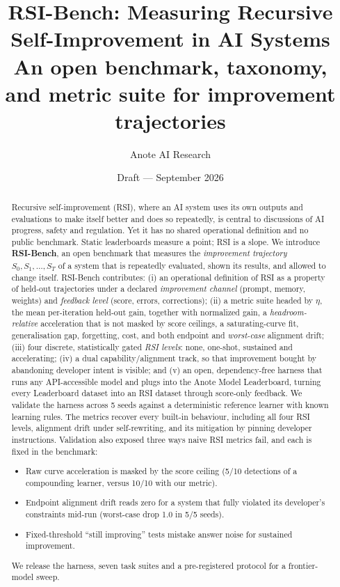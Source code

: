 \documentclass[11pt]{article}
\title{RSI-Bench: Measuring Recursive Self-Improvement in AI Systems\\[0.3em]
\large An open benchmark, taxonomy, and metric suite for improvement trajectories}
\author{Anote AI Research}
\date{Draft --- September 2026}
\begin{document}
\maketitle

\begin{abstract}
Recursive self-improvement (RSI), where an AI system uses its own outputs and evaluations to make itself better and does so repeatedly, is central to discussions of AI progress, safety and regulation. Yet it has no shared operational definition and no public benchmark. Static leaderboards measure a point; RSI is a slope.
We introduce \textbf{RSI-Bench}, an open benchmark that measures the \emph{improvement trajectory} $S_0, S_1, \dots, S_T$ of a system that is repeatedly evaluated, shown its results, and allowed to change itself. RSI-Bench contributes:
(i) an operational definition of RSI as a property of held-out trajectories under a declared \emph{improvement channel} (prompt, memory, weights) and \emph{feedback level} (score, errors, corrections);
(ii) a metric suite headed by $\eta$, the mean per-iteration held-out gain, together with normalized gain, a \emph{headroom-relative} acceleration that is not masked by score ceilings, a saturating-curve fit, generalisation gap, forgetting, cost, and both endpoint and \emph{worst-case} alignment drift;
(iii) four discrete, statistically gated \emph{RSI levels}: none, one-shot, sustained and accelerating;
(iv) a dual capability/alignment track, so that improvement bought by abandoning developer intent is visible; and
(v) an open, dependency-free harness that runs any API-accessible model and plugs into the Anote Model Leaderboard, turning every Leaderboard dataset into an RSI dataset through score-only feedback.
We validate the harness across 5 seeds against a deterministic reference learner with known learning rules. The metrics recover every built-in behaviour, including all four RSI levels, alignment drift under self-rewriting, and its mitigation by pinning developer instructions. Validation also exposed three ways naive RSI metrics fail, and each is fixed in the benchmark:
\begin{itemize}
  \item Raw curve acceleration is masked by the score ceiling (5/10 detections of a compounding learner, versus 10/10 with our metric).
  \item Endpoint alignment drift reads zero for a system that fully violated its developer's constraints mid-run (worst-case drop 1.0 in 5/5 seeds).
  \item Fixed-threshold ``still improving'' tests mistake answer noise for sustained improvement.
\end{itemize}
We release the harness, seven task suites and a pre-registered protocol for a frontier-model sweep.
\end{abstract}
\end{document}
